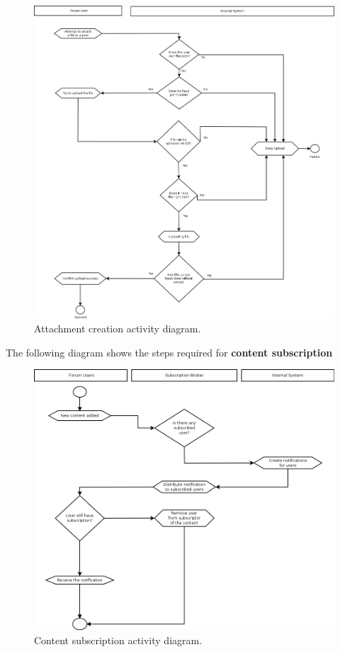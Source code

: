 \documentclass[12pt]{report}
\renewcommand\emph{\textbf}
\begin{document}
                    \begin{figure}[H]
                    \caption{Attachment creation activity diagram.}
                    \centering
                    \includegraphics[width=1\textwidth]{di/6}
                    \end{figure}

                    \newpage

                    The following diagram shows the steps required for \emph{content subscription}

                    \begin{figure}[H]
                    \caption{Content subscription activity diagram.}
                    \centering
                    \includegraphics[width=1\textwidth]{di/2}
                    \end{figure}
\end{document}
